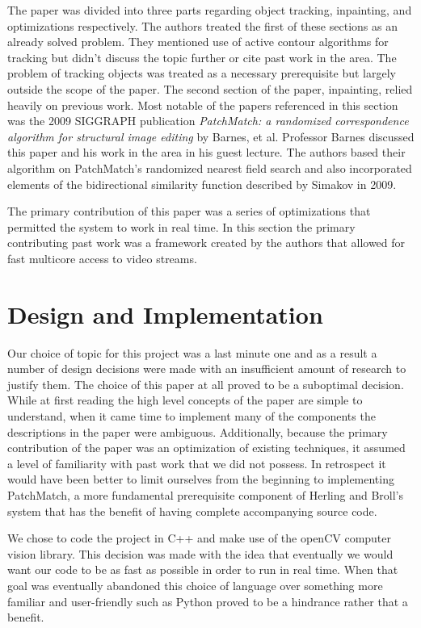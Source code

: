 \documentclass[12pt]{article}
\begin{document}
The paper was divided into three parts regarding object tracking, inpainting, and optimizations respectively. The authors treated the first of these sections as an already solved problem. They mentioned use of active contour algorithms for tracking but didn't discuss the topic further or cite past work in the area. The problem of tracking objects was treated as a necessary prerequisite but largely outside the scope of the paper. The second section of the paper, inpainting, relied heavily on previous work. Most notable of the papers referenced in this section was the 2009 SIGGRAPH publication \textit{PatchMatch: a randomized correspondence algorithm for structural image editing} by Barnes, et al. Professor Barnes discussed this paper and his work in the area in his guest lecture. The authors based their algorithm on PatchMatch's randomized nearest field search and also incorporated elements of the bidirectional similarity function described by Simakov in 2009. 

The primary contribution of this paper was a series of optimizations that permitted the system to work in real time. In this section the primary contributing past work was a framework created by the authors that allowed for fast multicore access to video streams. 

\section{Design and Implementation}

Our choice of topic for this project was a last minute one and as a result a number of design decisions were made with an insufficient amount of research to justify them. The choice of this paper at all proved to be a suboptimal decision. While at first reading the high level concepts of the paper are simple to understand, when it came time to implement many of the components the descriptions in the paper were ambiguous. Additionally, because the primary contribution of the paper was an optimization of existing techniques, it assumed a level of familiarity with past work that we did not possess. In retrospect it would have been better to limit ourselves from the beginning to implementing PatchMatch, a more fundamental prerequisite component of Herling and Broll's system that has the benefit of having complete accompanying source code. 

We chose to code the project in C++ and make use of the openCV computer vision library. This decision was made with the idea that eventually we would want our code to be as fast as possible in order to run in real time. When that goal was eventually abandoned this choice of language over something more familiar and user-friendly such as Python proved to be a hindrance rather that a benefit.
\end{document}
